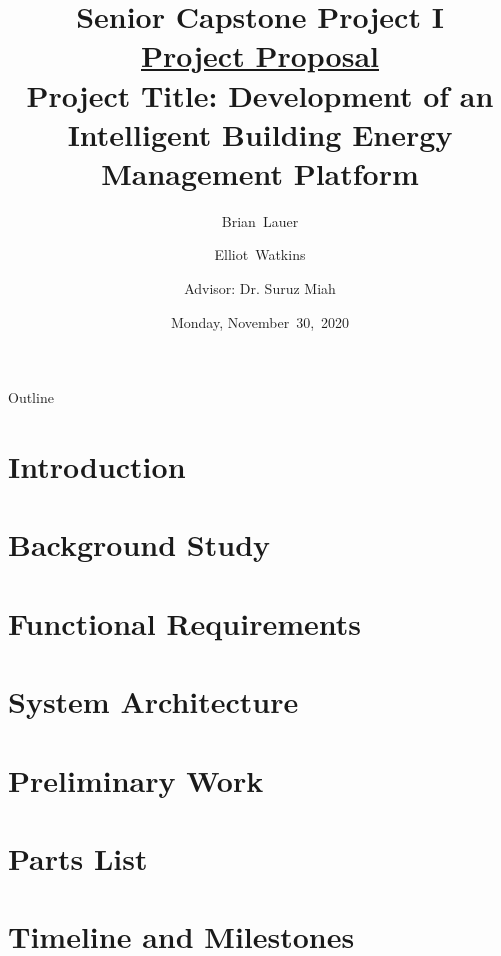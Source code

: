 \documentclass{beamer}
\title[Project Proposal]{Senior Capstone Project I\\\textbf{\underline{Project Proposal}}\\
\vspace{0.25in}
Project Title: Development of an Intelligent Building Energy Management Platform}
\author[B.~Lauer, E.~Watkins]{Brian~Lauer \and Elliot~Watkins \and
Advisor: Dr. Suruz Miah}
\institute[Bradley University] %
{
  Department of Electrical and Computer Engineering\\
  Bradley University\\
  1501 W. Bradley Avenue\\
  Peoria, IL, 61625, USA
}
\date[November~30,~2020]{Monday, November~30,~2020}
\begin{document}
\begin{frame}
  \titlepage
\end{frame}

\begin{frame}{Outline} %
  \tableofcontents%
\end{frame}

\section{Introduction}
\section{Background Study}
\section{Functional Requirements}
\section{System Architecture}
\section{Preliminary Work}
\section{Parts List}
\section{Timeline and Milestones}
\end{document}
